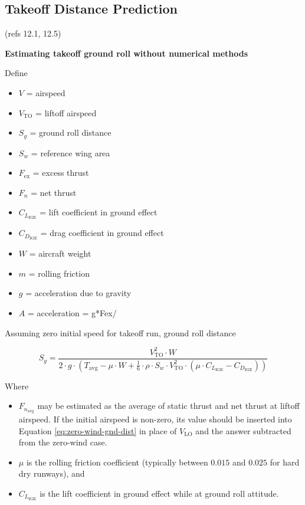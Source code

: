 \documentclass[
]{book}
\providecommand{\tightlist}{%
  \setlength{\itemsep}{0pt}\setlength{\parskip}{0pt}}
\begin{document}
\hypertarget{takeoff-distance-prediction}{%
\subsection{Takeoff Distance Prediction}\label{takeoff-distance-prediction}}

(refs 12.1, 12.5)

\textbf{Estimating takeoff ground roll without numerical methods}

Define

\begin{itemize}
\tightlist
\item
  \(V\) = airspeed
\item
  \(V_{\mathrm{TO}}\) = liftoff airspeed
\item
  \(S_g\) = ground roll distance
\item
  \(S_w\) = reference wing area
\item
  \(F_{\text{ex}}\) = excess thrust
\item
  \(F_n\) = net thrust
\item
  \(C_{L_{\mathrm{IGE}}}\) = lift coefficient in ground effect
\item
  \(C_{D_{\mathrm{IGE}}}\) = drag coefficient in ground effect
\item
  \(W\) = aircraft weight
\item
  \(m\) = rolling friction
\item
  \(g\) = acceleration due to gravity
\item
  \(A\) = acceleration = g*Fex/
\end{itemize}

Assuming zero initial speed for takeoff run, ground roll distance

\[
S_g = \frac{V_{\mathrm{TO}}^2 \cdot W}
{2 \cdot g \cdot 
  \left( 
        T_{\text{avg}} 
        - \mu \cdot W 
        + \frac{1}{6} \cdot \rho \cdot S_w \cdot V_{\mathrm{TO}}^2 \cdot 
        \left( \mu \cdot C_{L_{\mathrm{IGE}}} 
              - C_{D_{\mathrm{IGE}}} 
        \right) 
  \right)
}
\label{eq:gnd-roll-dist-to}
\]

Where

\begin{itemize}
\tightlist
\item
  \(F_{n_{\text{avg}}}\) may be estimated as the average of static thrust and net thrust at liftoff airspeed. If the initial airspeed is non-zero, its value should be inserted into Equation \eqref{eq:zero-wind-gnd-dist} in place of \(V_{\mathrm{LO}}\) and the answer subtracted from the zero-wind case.
\item
  \(\mu\) is the rolling friction coefficient (typically between \(0.015\) and \(0.025\) for hard dry runways), and
\item
  \(C_{L_{\mathrm{IGE}}}\) is the lift coefficient in ground effect while at ground roll attitude.
\end{itemize}
\end{document}
